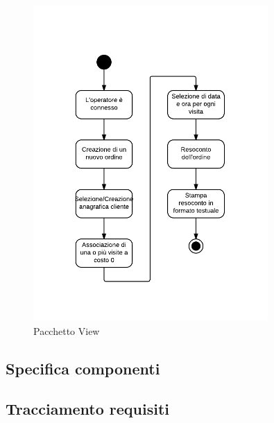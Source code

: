 \begin{figure}[H]
\centering
\includegraphics[width=0.8\textwidth]{images/tlite.png}
\caption{Pacchetto View \label{tlite}}
\end{figure}

\subsection{Specifica componenti}\label{specificacomponenti}


\subsection{Tracciamento requisiti}\label{tracciamento}



